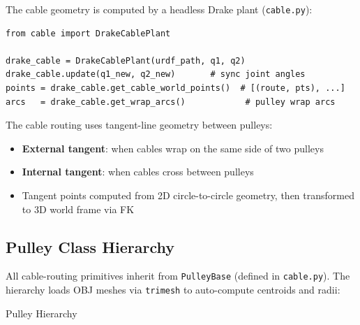 \documentclass[11pt,a4paper]{article}
\begin{document}
The cable geometry is computed by a headless Drake plant (\texttt{cable.py}):

\begin{lstlisting}[caption={Cable FK pipeline.}]
from cable import DrakeCablePlant

drake_cable = DrakeCablePlant(urdf_path, q1, q2)
drake_cable.update(q1_new, q2_new)       # sync joint angles
points = drake_cable.get_cable_world_points()  # [(route, pts), ...]
arcs   = drake_cable.get_wrap_arcs()            # pulley wrap arcs
\end{lstlisting}

The cable routing uses tangent-line geometry between pulleys:
\begin{itemize}[leftmargin=2em]
    \item \textbf{External tangent}: when cables wrap on the same side of two pulleys
    \item \textbf{Internal tangent}: when cables cross between pulleys
    \item Tangent points computed from 2D circle-to-circle geometry, then transformed to 3D world frame via FK
\end{itemize}

\subsection{Pulley Class Hierarchy}

All cable-routing primitives inherit from \texttt{PulleyBase} (defined in \texttt{cable.py}).  The hierarchy loads OBJ meshes via \texttt{trimesh} to auto-compute centroids and radii:

\begin{archbox}{Pulley Hierarchy}
\begin{center}
\end{center}
\end{archbox}
\end{document}

